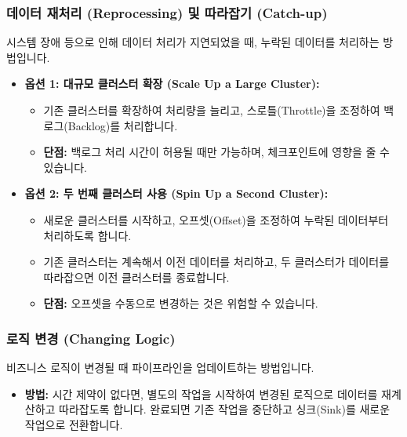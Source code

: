 \documentclass[11pt,a4paper]{article}
\theoremstyle{definition}
\begin{document}
\subsubsection{데이터 재처리 (Reprocessing) 및 따라잡기 (Catch-up)}
시스템 장애 등으로 인해 데이터 처리가 지연되었을 때, 누락된 데이터를 처리하는 방법입니다.
\begin{itemize}
    \item \textbf{옵션 1: 대규모 클러스터 확장 (Scale Up a Large Cluster):}
    \begin{itemize}
        \item 기존 클러스터를 확장하여 처리량을 늘리고, 스로틀(Throttle)을 조정하여 백로그(Backlog)를 처리합니다.
        \item \textbf{단점:} 백로그 처리 시간이 허용될 때만 가능하며, 체크포인트에 영향을 줄 수 있습니다.
    \end{itemize}
    \item \textbf{옵션 2: 두 번째 클러스터 사용 (Spin Up a Second Cluster):}
    \begin{itemize}
        \item 새로운 클러스터를 시작하고, 오프셋(Offset)을 조정하여 누락된 데이터부터 처리하도록 합니다.
        \item 기존 클러스터는 계속해서 이전 데이터를 처리하고, 두 클러스터가 데이터를 따라잡으면 이전 클러스터를 종료합니다.
        \item \textbf{단점:} 오프셋을 수동으로 변경하는 것은 위험할 수 있습니다.
    \end{itemize}
\end{itemize}

\subsubsection{로직 변경 (Changing Logic)}
비즈니스 로직이 변경될 때 파이프라인을 업데이트하는 방법입니다.
\begin{itemize}
    \item \textbf{방법:} 시간 제약이 없다면, 별도의 작업을 시작하여 변경된 로직으로 데이터를 재계산하고 따라잡도록 합니다. 완료되면 기존 작업을 중단하고 싱크(Sink)를 새로운 작업으로 전환합니다.
\end{itemize}
\end{document}
